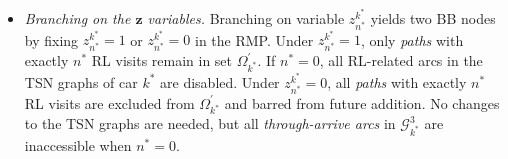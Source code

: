 \documentclass[12pt]{article}
\begin{document}





\begin{itemize}
    \item \textit{Branching on the $\boldsymbol{z}$ variables.}
    Branching on variable $z^{k^*}_{n^*}$ yields two BB nodes by fixing $z^{k^*}_{n^*}=1$ or $z^{k^*}_{n^*}=0$ in the RMP. Under $z^{k^*}_{n^*}=1$, only \textit{paths} with exactly $n^*$ RL visits remain in set $\Omega^{\prime}_{k^*}$. If $n^{*}=0$, all RL-related arcs in the TSN graphs of car $k^*$ are disabled. Under $z^{k^*}_{n^*}=0$, all \textit{paths} with exactly $n^*$ RL visits are excluded from $\Omega^{\prime}_{k^*}$ and barred from future addition. No changes to the TSN graphs are needed, but all \textit{through-arrive arcs} in $\mathcal{G}^3_{k^*}$ are inaccessible when $n^{*}=0$.

\end{itemize}
\end{document}
